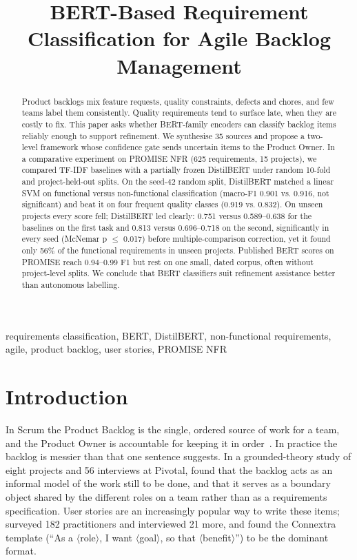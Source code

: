 \documentclass[conference,10pt,letterpaper]{IEEEtran}
\begin{document}
\title{BERT-Based Requirement Classification for Agile Backlog Management}
\author{\IEEEauthorblockN{[NAME]}}
\maketitle
\begin{abstract}Product backlogs mix feature requests, quality constraints, defects and chores, and few teams label them consistently. Quality requirements tend to surface late, when they are costly to fix. This paper asks whether BERT-family encoders can classify backlog items reliably enough to support refinement. We synthesise 35 sources and propose a two-level framework whose confidence gate sends uncertain items to the Product Owner. In a comparative experiment on PROMISE NFR (625 requirements, 15 projects), we compared TF-IDF baselines with a partially frozen DistilBERT under random 10-fold and project-held-out splits. On the seed-42 random split, DistilBERT matched a linear SVM on functional versus non-functional classification (macro-F1 0.901 vs. 0.916, not significant) and beat it on four frequent quality classes (0.919 vs. 0.832). On unseen projects every score fell; DistilBERT led clearly: 0.751 versus 0.589–0.638 for the baselines on the first task and 0.813 versus 0.696–0.718 on the second, significantly in every seed (McNemar p $\leq$ 0.017) before multiple-comparison correction, yet it found only 56\% of the functional requirements in unseen projects. Published BERT scores on PROMISE reach 0.94–0.99 F1 but rest on one small, dated corpus, often without project-level splits. We conclude that BERT classifiers suit refinement assistance better than autonomous labelling.\end{abstract}
\begin{IEEEkeywords}requirements classification, BERT, DistilBERT, non-functional requirements, agile, product backlog, user stories, PROMISE NFR\end{IEEEkeywords}

\section{Introduction}\label{sec:intro}
In Scrum the Product Backlog is the single, ordered source of work for a team, and the Product Owner is accountable for keeping it in order~\cite{scrumguide2020}. In practice the backlog is messier than that one sentence suggests. In a grounded-theory study of eight projects and 56 interviews at Pivotal, \textcite{sedano2019} found that the backlog acts as an informal model of the work still to be done, and that it serves as a boundary object shared by the different roles on a team rather than as a requirements specification. User stories are an increasingly popular way to write these items; \textcite{lucassen2016use} surveyed 182 practitioners and interviewed 21 more, and found the Connextra template (“As a $\langle$role$\rangle$, I want $\langle$goal$\rangle$, so that $\langle$benefit$\rangle$”) to be the dominant format.
\end{document}
